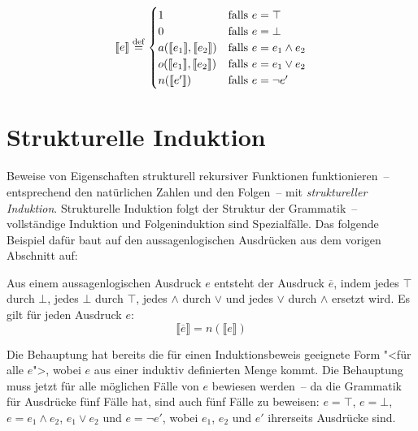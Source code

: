 \begin{displaymath}
  \llbracket e \rrbracket \stackrel{\rm def}{=}
  \begin{cases}
    1 & \textrm{falls } e = \top\\
    0 & \textrm{falls } e = \bot\\
    a(\llbracket e_1 \rrbracket, \llbracket e_2 \rrbracket) & 
    \textrm{falls } e =
    e_1\wedge e_2\\
    o(\llbracket e_1 \rrbracket, \llbracket e_2 \rrbracket) & 
    \textrm{falls } e =
    e_1\vee e_2\\
    n(\llbracket e' \rrbracket) & \textrm{falls } e = \neg e'
  \end{cases}
\end{displaymath}

\section{Strukturelle Induktion}
\label{sec:structural-induction}

Beweise von Eigenschaften strukturell rekursiver Funktionen
funktionieren~-- entsprechend den natürlichen Zahlen und den
Folgen~-- mit \textit{struktureller Induktion}. Strukturelle Induktion folgt
der Struktur der Grammatik~-- vollständige Induktion und
Folgeninduktion sind Spezialfälle.  Das folgende Beispiel dafür baut
auf den aussagenlogischen Ausdrücken aus dem vorigen Abschnitt auf:


\begin{satz}
  Aus einem aussagenlogischen Ausdruck $e$ entsteht der Ausdruck
  $\overline{e}$\label{page:overline}, indem jedes $\top$ durch $\bot$, jedes $\bot$ durch
  $\top$, jedes $\wedge$ durch $\vee$ und jedes $\vee$ durch $\wedge$
  ersetzt wird.  Es gilt für jeden Ausdruck $e$:
  \begin{displaymath}
    \llbracket \overline{e}\rrbracket = n(\llbracket e\rrbracket)
  \end{displaymath}
\end{satz}
%
Die Behauptung hat bereits die für einen Induktionsbeweis geeignete
Form "<für alle $e$">, wobei $e$ aus einer induktiv definierten Menge
kommt.  Die Behauptung muss jetzt für alle möglichen Fälle von $e$
bewiesen werden~-- da die Grammatik für Ausdrücke fünf Fälle hat, sind
auch fünf Fälle zu beweisen: $e=\top$, $e=\bot$, $e=e_1\wedge e_2$,
$e_1\vee e_2$ und $e=\neg e'$, wobei $e_1$, $e_2$ und $e'$
ihrerseits Ausdrücke sind.

